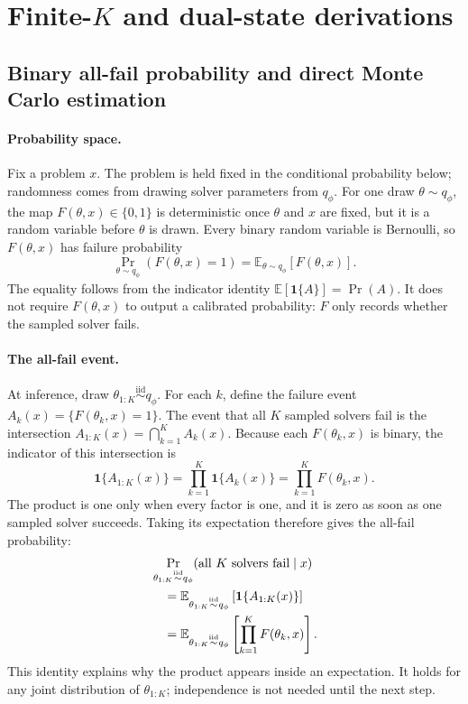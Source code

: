 \section{Finite-$K$ and dual-state derivations}
\label{app:proofs}

\subsection{Binary all-fail probability and direct Monte Carlo estimation}
\label{app:finite-k-details}

\paragraph{Probability space.}
Fix a problem $x$.
The problem is held fixed in the conditional probability below; randomness comes from drawing solver parameters from $q_\phi$.
For one draw $\theta\sim q_\phi$, the map $F(\theta,x)\in\{0,1\}$ is deterministic once $\theta$ and $x$ are fixed, but it is a random variable before $\theta$ is drawn.
Every binary random variable is Bernoulli, so $F(\theta,x)$ has failure probability
\begin{equation}
  \Pr_{\theta\sim q_\phi}\!\left(F(\theta,x)=1\right)
  =
  \mathbb E_{\theta\sim q_\phi}[F(\theta,x)].
  \label{eq:app-one-draw-failure}
\end{equation}
The equality follows from the indicator identity $\mathbb E[\mathbf 1\{A\}]=\Pr(A)$.
It does not require $F(\theta,x)$ to output a calibrated probability: $F$ only records whether the sampled solver fails.

\paragraph{The all-fail event.}
At inference, draw $\theta_{1:K}\overset{\mathrm{iid}}{\sim}q_\phi$.
For each $k$, define the failure event $A_k(x)=\{F(\theta_k,x)=1\}$.
The event that all $K$ sampled solvers fail is the intersection $A_{1:K}(x)=\bigcap_{k=1}^K A_k(x)$.
Because each $F(\theta_k,x)$ is binary, the indicator of this intersection is
\begin{equation}
  \mathbf 1\{A_{1:K}(x)\}
  =
  \prod_{k=1}^K \mathbf 1\{A_k(x)\}
  =
  \prod_{k=1}^K F(\theta_k,x).
  \label{eq:app-all-fail-indicator}
\end{equation}
The product is one only when every factor is one, and it is zero as soon as one sampled solver succeeds.
Taking its expectation therefore gives the all-fail probability:
\begin{align}
  &\Pr_{\theta_{1:K}\overset{\mathrm{iid}}{\sim}q_\phi}
  (\text{all $K$ solvers fail}\mid x)
  \notag\\
  &\quad=
  \mathbb E_{\theta_{1:K}\overset{\mathrm{iid}}{\sim}q_\phi}
  \left[\mathbf 1\{A_{1:K}(x)\}\right]
  \notag\\
  &\quad=
  \mathbb E_{\theta_{1:K}\overset{\mathrm{iid}}{\sim}q_\phi}
  \left[\prod_{k=1}^K F(\theta_k,x)\right].
  \label{eq:app-all-fail-expectation}
\end{align}
This identity explains why the product appears inside an expectation.
It holds for any joint distribution of $\theta_{1:K}$; independence is not needed until the next step.

